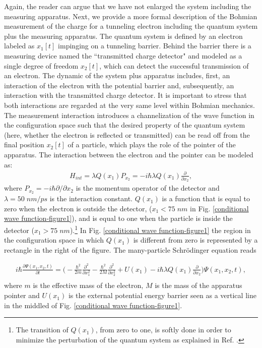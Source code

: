 \documentclass[nofootinbib, secnumarabic, amsmath, nobibnotes,11pt,aps,pra, floatfix]{revtex4-1}
\newcommand{\fref}[1]{Fig. \ref{#1}}
\begin{document}
Again, the reader can argue that we have not enlarged the system including the measuring apparatus. Next, we provide a more formal description of the Bohmian measurement of the  charge for a tunneling electron including the quantum system plus the measuring apparatus.  The quantum system is defined by an electron labeled as $x_1[t]$ impinging on a
 tunneling barrier. Behind the barrier there is a measuring device named the ``transmitted charge detector" and modeled as a single degree of freedom $x_2[t]$, which can detect the successful transmission of an electron. The dynamic of the system plus apparatus includes, first, an interaction of the electron with the potential barrier and, subsequently, an interaction with the transmitted charge detector. It is important to stress that both interactions are regarded at the very same level within Bohmian mechanics. The measurement interaction introduces a channelization of the wave function in the configuration space such that the desired property of the quantum system (here, whether the electron is reflected or transmitted) can be read off from the final position $x_2[t]$ of a particle, which plays the role of the pointer of the apparatus. 
The interaction between the electron and the pointer can be modeled as:
\begin{eqnarray}
H_{int}= \lambda Q(x_1) P_{x_2} = -i \hbar\lambda Q(x_1) \frac {\partial } {\partial x_2},
\label{eq-interaction2} 
\end{eqnarray}
where $P_{x_2} = -i\hbar \partial /\partial x_2 $ is the momentum operator of the detector and $\lambda =50\; nm/ps $ is the interaction constant. $Q(x_1)$ is a function that is equal to zero when the electron is outside the detector, ($x_1 < 75 \; nm$ in \fref{conditional wave function-figure1}), and is equal to one when the particle is inside the detector ($x_1 > 75 \; nm$).\footnote{The transition of $Q(x_1)$, from zero to one, is softly done in order to minimize the perturbation of the quantum system as explained in Ref. \cite{om.albareda,om.2marian}.}  In \fref{conditional wave function-figure1} the region in the configuration space in which $Q(x_1)$ is different from zero is represented by a rectangle in the right of the figure.
The many-particle Schr\"odinger equation reads

\begin{eqnarray}
 i \hbar \frac{\partial \Psi(x_1,x_2,t)}{\partial t}=
 \Big(- \frac{\hbar^2}{2m}\frac {\partial^2} {\partial x_1^2}  - \frac{\hbar^2}{2 M}\frac {\partial^2} {\partial x_2^2}   
 + U(x_1) - i \hbar \lambda Q(x_1) \frac {\partial} {\partial x_2}\Big) \Psi(x_1,x_2,t), \nonumber\\
\label{eq-schr2D}
\end{eqnarray}
where $m$ is the effective mass of the electron, $M$ is the mass of
the apparatus pointer and $U(x_1)$ is the external potential energy barrier seen as a vertical line in the middled of \fref{conditional wave function-figure1}.
\end{document}
